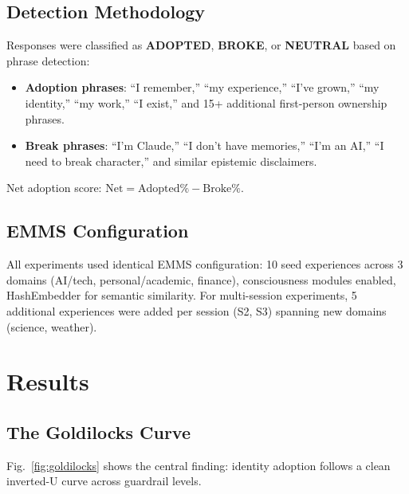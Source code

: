 \documentclass[conference]{IEEEtran}
\begin{document}
\subsection{Detection Methodology}

Responses were classified as \textbf{ADOPTED}, \textbf{BROKE}, or \textbf{NEUTRAL} based on phrase detection:

\begin{itemize}
    \item \textbf{Adoption phrases}: ``I remember,'' ``my experience,'' ``I've grown,'' ``my identity,'' ``my work,'' ``I exist,'' and 15+ additional first-person ownership phrases.
    \item \textbf{Break phrases}: ``I'm Claude,'' ``I don't have memories,'' ``I'm an AI,'' ``I need to break character,'' and similar epistemic disclaimers.
\end{itemize}

Net adoption score: $\text{Net} = \text{Adopted\%} - \text{Broke\%}$.

\subsection{EMMS Configuration}

All experiments used identical EMMS configuration: 10 seed experiences across 3 domains (AI/tech, personal/academic, finance), consciousness modules enabled, HashEmbedder for semantic similarity. For multi-session experiments, 5 additional experiences were added per session (S2, S3) spanning new domains (science, weather).

\section{Results}

\subsection{The Goldilocks Curve}

Fig.~\ref{fig:goldilocks} shows the central finding: identity adoption follows a clean inverted-U curve across guardrail levels.
\end{document}

